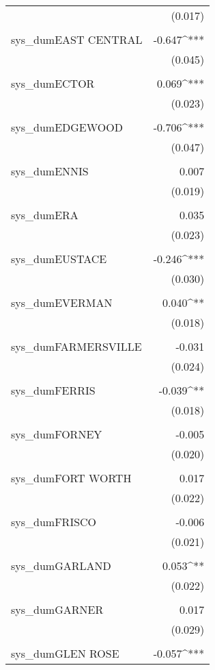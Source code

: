 \begin{table}[!htbp]
\begin{tabular}{@{\extracolsep{5pt}}lD{.}{.}{-3} }
  & (0.017) \\ 
  & \\ 
 sys\_dumEAST CENTRAL & -0.647^{***} \\ 
  & (0.045) \\ 
  & \\ 
 sys\_dumECTOR & 0.069^{***} \\ 
  & (0.023) \\ 
  & \\ 
 sys\_dumEDGEWOOD & -0.706^{***} \\ 
  & (0.047) \\ 
  & \\ 
 sys\_dumENNIS & 0.007 \\ 
  & (0.019) \\ 
  & \\ 
 sys\_dumERA & 0.035 \\ 
  & (0.023) \\ 
  & \\ 
 sys\_dumEUSTACE & -0.246^{***} \\ 
  & (0.030) \\ 
  & \\ 
 sys\_dumEVERMAN & 0.040^{**} \\ 
  & (0.018) \\ 
  & \\ 
 sys\_dumFARMERSVILLE & -0.031 \\ 
  & (0.024) \\ 
  & \\ 
 sys\_dumFERRIS & -0.039^{**} \\ 
  & (0.018) \\ 
  & \\ 
 sys\_dumFORNEY & -0.005 \\ 
  & (0.020) \\ 
  & \\ 
 sys\_dumFORT WORTH & 0.017 \\ 
  & (0.022) \\ 
  & \\ 
 sys\_dumFRISCO & -0.006 \\ 
  & (0.021) \\ 
  & \\ 
 sys\_dumGARLAND & 0.053^{**} \\ 
  & (0.022) \\ 
  & \\ 
 sys\_dumGARNER & 0.017 \\ 
  & (0.029) \\ 
  & \\ 
 sys\_dumGLEN ROSE & -0.057^{***} \\ 

\end{tabular}
\end{table}
